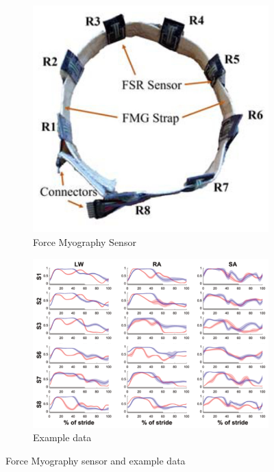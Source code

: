 \begin{figure}[!hbtp]
    \centering
    \centering
    \begin{subfigure}[b]{0.4\textwidth}
        \centering
        \includegraphics[width=\textwidth]{content/2-Background/sensors/Force-Myography-Sensor.jpg}
        \caption{Force Myography Sensor\cite{Godiyal2018}}
    \end{subfigure}
    \hfill
    \begin{subfigure}[b]{0.55\textwidth}
        \centering
        \includegraphics[width=\textwidth]{content/2-Background/sensors/Force_Myography_data.png}
        \caption{Example data\cite{Godiyal2018a}}
    \end{subfigure}
    \caption{Force Myography sensor and example data}
    \label{fig:bck-force-myography-sensors}
\end{figure}

